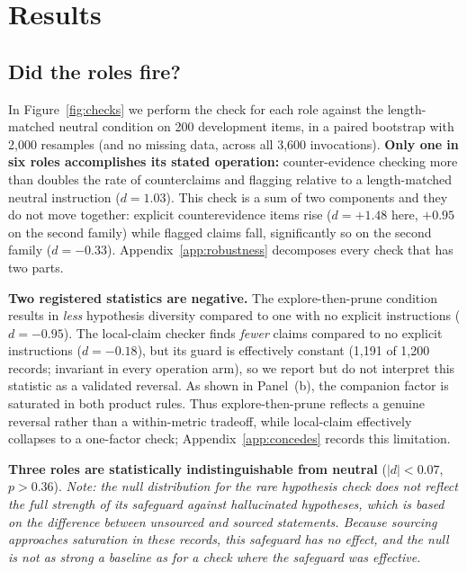 \section{Results}
\label{sec:results}

\subsection{Did the roles fire?}
\label{sec:did-fire}

In Figure~\ref{fig:checks} we perform the check for each role against the length-matched neutral
condition on 200 development items, in a paired bootstrap with 2,000 resamples (and no missing data,
across all 3,600 invocations). \textbf{Only one in six roles accomplishes its stated operation:}
counter-evidence checking more than doubles the rate of counterclaims and flagging relative to a
length-matched neutral instruction ($d = 1.03$). This check is a sum of two components and they do
not move together: explicit counterevidence items rise ($d = +1.48$ here, $+0.95$ on the second
family) while flagged claims fall, significantly so on the second family ($d = -0.33$).
Appendix~\ref{app:robustness} decomposes every check that has two parts.

\textbf{Two registered statistics are negative.} The explore-then-prune condition results in
\emph{less} hypothesis diversity compared to one with no explicit instructions ($d = -0.95$). The
local-claim checker finds \emph{fewer} claims compared to no explicit instructions ($d = -0.18$),
but its guard is effectively constant (1,191 of 1,200 records; invariant in every operation arm), so
we report but do not interpret this statistic as a validated reversal. As shown in Panel~(b), the
companion factor is saturated in both product rules. Thus explore-then-prune reflects a genuine
reversal rather than a within-metric tradeoff, while local-claim effectively collapses to a
one-factor check; Appendix~\ref{app:concedes} records this limitation.

\textbf{Three roles are statistically indistinguishable from neutral} ($|d| < 0.07$, $p > 0.36$).
\emph{Note: the null distribution for the rare hypothesis check does not reflect the full strength
of its safeguard against hallucinated hypotheses, which is based on the difference between unsourced
and sourced statements. Because sourcing approaches saturation in these records, this safeguard has
no effect, and the null is not as strong a baseline as for a check where the safeguard was
effective.}

